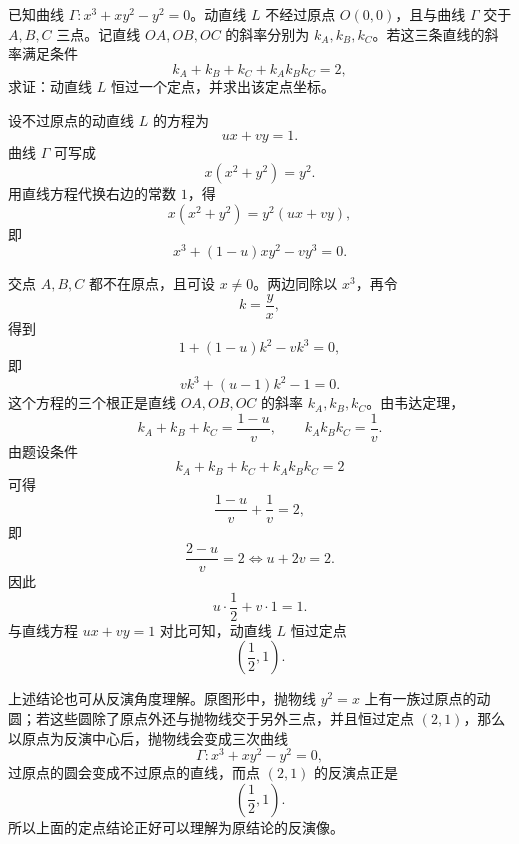 \begin{example}
    已知曲线 $\Gamma: x^3 + xy^2 - y^2 = 0$。动直线 $L$ 不经过原点 $O(0,0)$，且与曲线 $\Gamma$ 交于 $A, B, C$ 三点。记直线 $OA, OB, OC$ 的斜率分别为 $k_A, k_B, k_C$。若这三条直线的斜率满足条件
    \[
    k_A + k_B + k_C + k_A k_B k_C = 2,
    \]
    求证：动直线 $L$ 恒过一个定点，并求出该定点坐标。
\end{example}
\begin{solution}
设不过原点的动直线 $L$ 的方程为
\[
ux+vy=1.
\]
曲线 $\Gamma$ 可写成
\[
x(x^2+y^2)=y^2.
\]
用直线方程代换右边的常数 $1$，得
\[
x(x^2+y^2)=y^2(ux+vy),
\]
即
\[
x^3+(1-u)xy^2-vy^3=0.
\]

交点 $A,B,C$ 都不在原点，且可设 $x\neq 0$。两边同除以 $x^3$，再令
\[
k=\frac{y}{x},
\]
得到
\[
1+(1-u)k^2-vk^3=0,
\]
即
\[
vk^3+(u-1)k^2-1=0.
\]
这个方程的三个根正是直线 $OA,OB,OC$ 的斜率 $k_A,k_B,k_C$。由韦达定理，
\[
k_A+k_B+k_C=\frac{1-u}{v},\qquad k_Ak_Bk_C=\frac{1}{v}.
\]
由题设条件
\[
k_A+k_B+k_C+k_Ak_Bk_C=2
\]
可得
\[
\frac{1-u}{v}+\frac{1}{v}=2,
\]
即
\[
\frac{2-u}{v}=2 \iff u+2v=2.
\]
因此
\[
u\cdot \frac12+v\cdot 1=1.
\]
与直线方程 $ux+vy=1$ 对比可知，动直线 $L$ 恒过定点
\[
\left(\frac12,1\right).
\]
\end{solution}
上述结论也可从反演角度理解。原图形中，抛物线 $y^2=x$ 上有一族过原点的动圆；若这些圆除了原点外还与抛物线交于另外三点，并且恒过定点 $(2,1)$，那么以原点为反演中心后，抛物线会变成三次曲线
\[
\Gamma:x^3+xy^2-y^2=0,
\]
过原点的圆会变成不过原点的直线，而点 $(2,1)$ 的反演点正是
\[
\left(\frac12,1\right).
\]
所以上面的定点结论正好可以理解为原结论的反演像。


